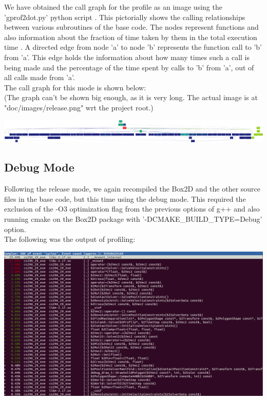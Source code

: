 \documentclass[11pt]{article}
\begin{document}
We have obtained the call graph for the profile as an image using the 'gprof2dot.py' python script \cite{gprof2dot}. This pictorially shows the calling relationships between various subroutines of the base code. The nodes represent functions and also information about the fraction of time taken by them in the total execution time . A directed edge from node 'a' to node 'b' represents the function call to 'b' from 'a'. This edge holds the information about how many times such a call is being made and the percentage of the time spent by calls to 'b' from 'a', out of all calls made from 'a'. \\
The call graph for this mode is shown below: \\
(The graph can't be shown big enough, as it is very long. The actual image is at "doc/images/release.png" wrt the project root.)

\begin{center} 
\includegraphics [scale=0.05]{./images/release_perf}
\end{center}


\subsection{Debug Mode}
Following the release mode, we again recompiled the Box2D and the other source files in the base code, but this time using the debug mode. This required the exclusion of the -O3 optimization flag from the previous options of g++ and also running cmake on the Box2D package with '-DCMAKE\_BUILD\_TYPE=Debug' option. \\
The following was the output of profiling: \\ 

\begin{center} 
\includegraphics [scale=0.4]{./images/debug} 
\end{center}
\end{document}
